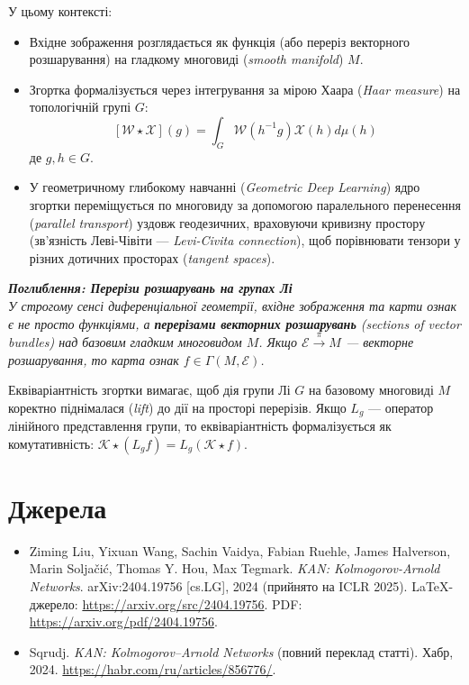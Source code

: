 \documentclass[12pt,a4paper]{article}
\renewenvironment{leftbar}{%
	\def\FrameCommand{\vrule width 1pt \hspace{10pt}}%
	\MakeFramed {\advance\hsize-\width \FrameRestore}}%
{\endMakeFramed}
\begin{document}
	У цьому контексті:
	\begin{itemize}
		\item Вхідне зображення розглядається як функція (або переріз векторного розшарування) на гладкому многовиді (\textit{smooth manifold}) $M$.
		\item Згортка формалізується через інтегрування за мірою Хаара (\textit{Haar measure}) на топологічній групі $G$:
		$$ [\mathcal{W} \star \mathcal{X}](g) = \int_{G} \mathcal{W}(h^{-1}g) \mathcal{X}(h) d\mu(h) $$
		де $g, h \in G$. 
		\item У геометричному глибокому навчанні (\textit{Geometric Deep Learning}) ядро згортки переміщується по многовиду за допомогою паралельного перенесення (\textit{parallel transport}) уздовж геодезичних, враховуючи кривизну простору (зв'язність Леві-Чівіти — \textit{Levi-Civita connection}), щоб порівнювати тензори у різних дотичних просторах (\textit{tangent spaces}).
	\end{itemize}


	\begin{leftbar}
		\itshape
		\textbf{Поглиблення: Перерізи розшарувань на групах Лі} \\
		У строгому сенсі диференціальної геометрії, вхідне зображення та карти ознак є не просто функціями, а \textbf{перерізами векторних розшарувань} (\textit{sections of vector bundles}) над базовим гладким многовидом $M$. Якщо $\mathcal{E} \xrightarrow{\pi} M$ — векторне розшарування, то карта ознак $f \in \Gamma(M, \mathcal{E})$.
		
		Еквіваріантність згортки вимагає, щоб дія групи Лі $G$ на базовому многовиді $M$ коректно піднімалася (\textit{lift}) до дії на просторі перерізів. Якщо $L_g$ — оператор лінійного представлення групи, то еквіваріантність формалізується як комутативність: $\mathcal{K} \star (L_g f) = L_g (\mathcal{K} \star f)$.
	\end{leftbar}
	
	\section*{Джерела}
	\begin{itemize}
		\item Ziming Liu, Yixuan Wang, Sachin Vaidya, Fabian Ruehle, James Halverson, Marin Soljačić, Thomas Y. Hou, Max Tegmark. \textit{KAN: Kolmogorov-Arnold Networks}. arXiv:2404.19756 [cs.LG], 2024 (прийнято на ICLR 2025). LaTeX-джерело: \url{https://arxiv.org/src/2404.19756}. PDF: \url{https://arxiv.org/pdf/2404.19756}.
		\item Sqrudj. \textit{KAN: Kolmogorov–Arnold Networks} (повний переклад статті). Хабр, 2024. \url{https://habr.com/ru/articles/856776/}.
	\end{itemize}
	
\end{document}
